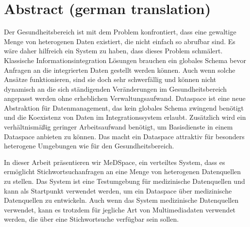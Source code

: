 \chapter*{Abstract (german translation)}

Der Gesundheitsbereich ist mit dem Problem konfrontiert, dass eine gewaltige Menge von heterogenen Daten existiert, die nicht einfach so abrufbar sind. Es wäre daher hilfreich ein System zu haben, dass dieses Problem schmälert. Klassische Informationsintegration Lösungen brauchen ein globales Schema bevor Anfragen an die integrierten Daten gestellt werden können. Auch wenn solche Ansätze funktionieren, sind sie doch sehr schwerfällig und können nicht dynamisch an die sich ständigenden Veränderungen im Gesundheitsbereich angepasst werden ohne erheblichen Verwaltungsaufwand. Dataspace ist eine neue Abstraktion für Datenmanagement, das kein globales Schema zwingend benötigt und die Koexistenz von Daten im Integrationssystem erlaubt. Zusätzlich wird ein verhältnismäßig geringer Arbeitsaufwand benötigt, um Basisdienste in einem Dataspace anbieten zu können. Das macht ein Dataspace attraktiv für besonders heterogene Umgebungen wie für den Gesundheitsbereich. 

In dieser Arbeit präsentieren wir MeDSpace, ein verteiltes System, dass es ermöglicht Stichwortsuchanfragen an eine Menge von heterogenen Datenquellen zu stellen. Das System ist eine Testumgebung für medizinische Datenquellen und kann als Startpunkt verwendet werden, um ein Dataspace über medizinische Datenquellen zu entwickeln. Auch wenn das System medizinische Datenquellen verwendet, kann es trotzdem für jegliche Art von Multimediadaten verwendet werden, die über eine Stichwortsuche verfügbar sein sollen.